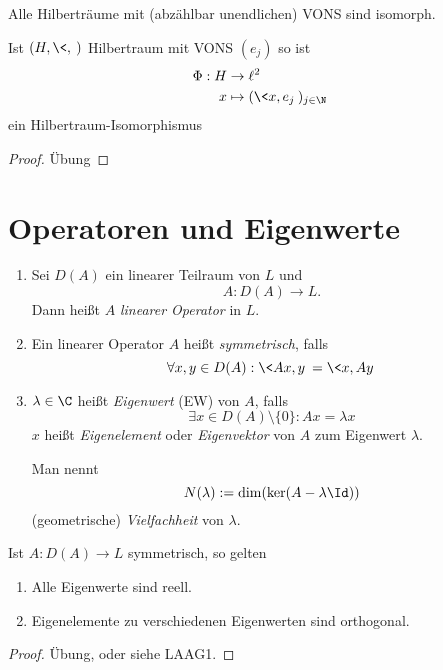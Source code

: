 \documentclass{mycourse}
\begin{document}
\begin{st} \label{1.16}
	Alle Hilberträume mit (abzählbar unendlichen) VONS sind isomorph. 

	Ist $(H,\<,\>)$ Hilbertraum mit VONS $(e_j)$ so ist
	\begin{align*}
		\Phi: H &\to \ell^2 \\
		x &\mapsto (\<x,e_j\>)_{j\in \N}
	\end{align*}
	ein Hilbertraum-Isomorphismus
	\begin{proof}
		Übung
	\end{proof}
\end{st}



\section{Operatoren und Eigenwerte}



\begin{df} \label{1.17}
	\begin{enumerate}[1)]
		\item
			Sei $D(A)$ ein linearer Teilraum von $L$ und
			\[
				A : D(A) \to L.
			\]
			Dann heißt $A$ \emph{linearer Operator} in $L$.
		\item
			Ein linearer Operator $A$ heißt \emph{symmetrisch}, falls
			\[
				\forall x,y \in D(A) : \<Ax,y\> = \<x,Ay\>
			\]
		\item
			$\lambda \in \C$ heißt \emph{Eigenwert} (EW) von $A$, falls
			\[
				\exists x \in D(A) \setminus \{0\} : Ax = \lambda x
			\]
			$x$ heißt \emph{Eigenelement} oder \emph{Eigenvektor} von $A$ zum Eigenwert $\lambda$.

			Man nennt
			\[
				N(\lambda) := \dim (\ker(A-\lambda \Id))
			\]
			(geometrische) \emph{Vielfachheit} von $\lambda$.
	\end{enumerate}
\end{df}

\begin{st} \label{1.18}
	Ist $A: D(A) \to L$ symmetrisch, so gelten
	\begin{enumerate}[1)]
		\item
			Alle Eigenwerte sind reell.
		\item
			Eigenelemente zu verschiedenen Eigenwerten sind orthogonal.
	\end{enumerate}
	\begin{proof}
		Übung, oder siehe LAAG1.
	\end{proof}
\end{st}
\end{document}
